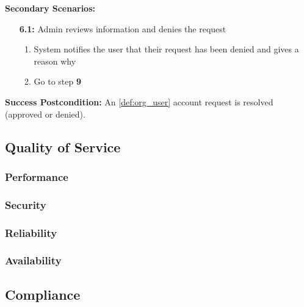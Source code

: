 \documentclass{article}
\begin{document}
\begin{enumerate}[label=\textbf{UC\arabic*}]
        \textbf{Secondary Scenarios:} 
        \begin{itemize}
            \item[{\bf 6.1:}] Admin reviews information and denies the request
            \begin{enumerate}[label=\textbf{\arabic*.}]
                \item System notifies the user that their request has been denied and gives a reason why
                \item Go to step \textbf{9}
            \end{enumerate}
        \end{itemize}
        \textbf{Success Postcondition:} An \ref{def:org_user} account request is resolved (approved or denied).
    
\end{enumerate}

\subsection{Quality of Service}

\subsubsection{Performance}


\subsubsection{Security}


\subsubsection{Reliability}


\subsubsection{Availability}


\subsection{Compliance}
\label{sub:compliance}
\end{document}

